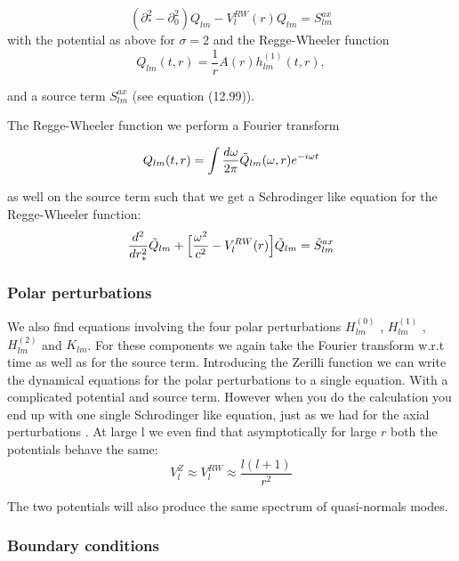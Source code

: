 \documentclass[12 pt]{article}
\begin{document}
\begin{equation}
	(\partial_*^2 - \partial_0^2)Q_{lm} - V_l^{RW}(r)Q_{lm} = S_{lm}^{ax}
\end{equation}
with the potential as above for $\sigma = 2$ and the Regge-Wheeler function 
\begin{equation}
	Q_{lm}(t,r) = \frac{1}{r} A(r) h^{(1)}_{lm}(t,r),
\end{equation}

and a source term $S_{lm}^{ax}$ (see \cite{maggiore} equation (12.99)).

The Regge-Wheeler function we perform a Fourier transform 

\begin{equation}
	Q_{lm}(t,r) = \int \frac{d\omega}{2 \pi} \Tilde{Q}_{lm}(\omega ,r) e^{-i\omega t}
\end{equation}

as well on the source term such that we get a Schrodinger like equation for the Regge-Wheeler function:
\begin{equation}
	\frac{d^2}{dr_*^2}\Tilde{Q}_{lm} + \Big[\frac{\omega^2}{c^2} - V_l^{RW}(r) \Big] \Tilde{Q}_{lm} = \Tilde{S}_{lm}^{ax}
\end{equation}

\subsubsection{Polar perturbations}

We also find equations involving the four polar perturbations $H^{(0)}_{lm}$ , $H^{(1)}_{lm}$ , $H^{(2)}_{lm}$ and $K_{lm}$. For these components we again take the Fourier transform w.r.t time as well as for the source term. Introducing the Zerilli function we can write the dynamical equations for the polar perturbations to a single equation. With a complicated potential and source term. However when you do the calculation you end up with one single Schrodinger like equation, just as we had for the axial perturbations . At large l we even find that asymptotically for large $r$ both the potentials behave the same:
\begin{equation}
	V_l^Z \approx V_l^{RW} \approx \frac{l(l+1)}{r^2}
\end{equation}

The two potentials will also produce the same spectrum of quasi-normals modes.

\subsubsection{Boundary conditions}
\end{document}
